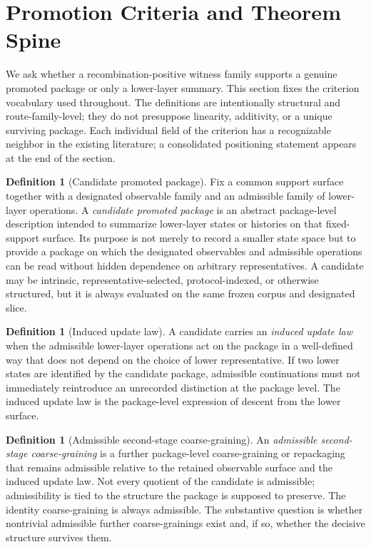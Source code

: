 \documentclass[11pt]{article}
\theoremstyle{definition}
\newtheorem{definition}[theorem]{Definition}
\begin{document}
 \section{Promotion Criteria and Theorem Spine}\label{sec:criteria}

We ask whether a recombination-positive witness family supports a genuine promoted package or only a lower-layer summary. This section fixes the criterion vocabulary used throughout. The definitions are intentionally structural and route-family-level; they do not presuppose linearity, additivity, or a unique surviving package. Each individual field of the criterion has a recognizable neighbor in the existing literature; a consolidated positioning statement appears at the end of the section.

\begin{definition}[Candidate promoted package]\label{def:candidate-promoted-package}
Fix a common support surface together with a designated observable family and an admissible family of lower-layer operations. A \emph{candidate promoted package} is an abstract package-level description intended to summarize lower-layer states or histories on that fixed-support surface. Its purpose is not merely to record a smaller state space but to provide a package on which the designated observables and admissible operations can be read without hidden dependence on arbitrary representatives. A candidate may be intrinsic, representative-selected, protocol-indexed, or otherwise structured, but it is always evaluated on the same frozen corpus and designated slice.
\end{definition}

\begin{definition}[Induced update law]\label{def:induced-update-law}
A candidate carries an \emph{induced update law} when the admissible lower-layer operations act on the package in a well-defined way that does not depend on the choice of lower representative. If two lower states are identified by the candidate package, admissible continuations must not immediately reintroduce an unrecorded distinction at the package level. The induced update law is the package-level expression of descent from the lower surface.
\end{definition}

\begin{definition}[Admissible second-stage coarse-graining]\label{def:second-stage-coarse-graining}
An \emph{admissible second-stage coarse-graining} is a further package-level coarse-graining or repackaging that remains admissible relative to the retained observable surface and the induced update law. Not every quotient of the candidate is admissible; admissibility is tied to the structure the package is supposed to preserve. The identity coarse-graining is always admissible. The substantive question is whether nontrivial admissible further coarse-grainings exist and, if so, whether the decisive structure survives them.
\end{definition}
\end{document}
